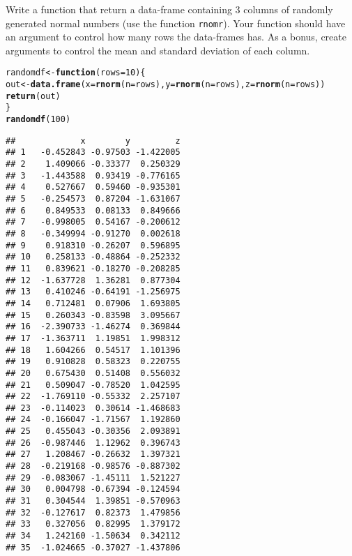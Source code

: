 \documentclass[12pt,a4paper]{scrartcl}\usepackage[]{graphicx}\usepackage[]{color}
\makeatletter
\newcommand{\hlnum}[1]{\textcolor[rgb]{0.686,0.059,0.569}{#1}}%
\newcommand{\hlstd}[1]{\textcolor[rgb]{0.345,0.345,0.345}{#1}}%
\newcommand{\hlkwa}[1]{\textcolor[rgb]{0.161,0.373,0.58}{\textbf{#1}}}%
\newcommand{\hlkwb}[1]{\textcolor[rgb]{0.69,0.353,0.396}{#1}}%
\newcommand{\hlkwc}[1]{\textcolor[rgb]{0.333,0.667,0.333}{#1}}%
\newcommand{\hlkwd}[1]{\textcolor[rgb]{0.737,0.353,0.396}{\textbf{#1}}}%
\newenvironment{kframe}{%
 \def\at@end@of@kframe{}%
 \ifinner\ifhmode%
  \def\at@end@of@kframe{\end{minipage}}%
  \begin{minipage}{\columnwidth}%
 \fi\fi%
 \def\FrameCommand##1{\hskip\@totalleftmargin \hskip-\fboxsep
 \colorbox{shadecolor}{##1}\hskip-\fboxsep
     \hskip-\linewidth \hskip-\@totalleftmargin \hskip\columnwidth}%
 \MakeFramed {\advance\hsize-\width
   \@totalleftmargin\z@ \linewidth\hsize
   \@setminipage}}%
 {\par\unskip\endMakeFramed%
 \at@end@of@kframe}
\newenvironment{knitrout}{}{} %
\makeatother
\begin{document}
\begin{Exercise}[difficulty=2, title={Write a data-frame of random values in output}]
Write a function that return a data-frame containing 3 columns of randomly generated normal numbers (use the function \texttt{rnomr}). Your function should have an argument to control how many rows the data-frames has. As a bonus, create arguments to control the mean and standard deviation of each column.
\end{Exercise}
\begin{Answer}
\begin{knitrout}
\color{fgcolor}\begin{kframe}
\begin{alltt}
\hlstd{randomdf} \hlkwb{<-} \hlkwa{function}\hlstd{(}\hlkwc{rows}\hlstd{=}\hlnum{10}\hlstd{)\{}
  \hlstd{out} \hlkwb{<-} \hlkwd{data.frame}\hlstd{(}\hlkwc{x} \hlstd{=} \hlkwd{rnorm}\hlstd{(}\hlkwc{n}\hlstd{=rows),} \hlkwc{y}\hlstd{=} \hlkwd{rnorm}\hlstd{(}\hlkwc{n}\hlstd{=rows),} \hlkwc{z} \hlstd{=} \hlkwd{rnorm}\hlstd{(}\hlkwc{n}\hlstd{=rows))}
  \hlkwd{return}\hlstd{(out)}
\hlstd{\}}
\hlkwd{randomdf}\hlstd{(}\hlnum{100}\hlstd{)}
\end{alltt}
\begin{verbatim}
##             x        y         z
## 1   -0.452843 -0.97503 -1.422005
## 2    1.409066 -0.33377  0.250329
## 3   -1.443588  0.93419 -0.776165
## 4    0.527667  0.59460 -0.935301
## 5   -0.254573  0.87204 -1.631067
## 6    0.849533  0.08133  0.849666
## 7   -0.998005  0.54167 -0.200612
## 8   -0.349994 -0.91270  0.002618
## 9    0.918310 -0.26207  0.596895
## 10   0.258133 -0.48864 -0.252332
## 11   0.839621 -0.18270 -0.208285
## 12  -1.637728  1.36281  0.877304
## 13   0.410246 -0.64191 -1.256975
## 14   0.712481  0.07906  1.693805
## 15   0.260343 -0.83598  3.095667
## 16  -2.390733 -1.46274  0.369844
## 17  -1.363711  1.19851  1.998312
## 18   1.604266  0.54517  1.101396
## 19   0.910828  0.58323  0.220755
## 20   0.675430  0.51408  0.556032
## 21   0.509047 -0.78520  1.042595
## 22  -1.769110 -0.55332  2.257107
## 23  -0.114023  0.30614 -1.468683
## 24  -0.166047 -1.71567  1.192860
## 25   0.455043 -0.30356  2.093891
## 26  -0.987446  1.12962  0.396743
## 27   1.208467 -0.26632  1.397321
## 28  -0.219168 -0.98576 -0.887302
## 29  -0.083067 -1.45111  1.521227
## 30   0.004798 -0.67394 -0.124594
## 31   0.304544  1.39851 -0.570963
## 32  -0.127617  0.82373  1.479856
## 33   0.327056  0.82995  1.379172
## 34   1.242160 -1.50634  0.342112
## 35  -1.024665 -0.37027 -1.437806

\end{verbatim}
\end{kframe}
\end{knitrout}
\end{Answer}
\end{document}
